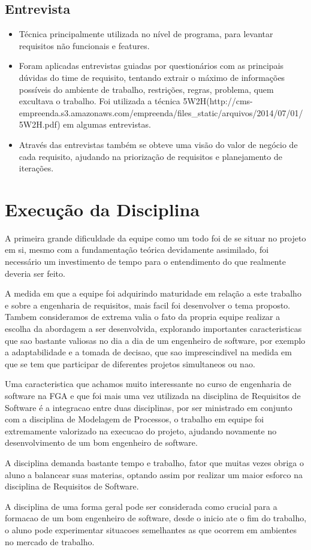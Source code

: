 \subsection{Entrevista}
\begin{itemize}
\item Técnica principalmente utilizada no nível de programa, para levantar requisitos não funcionais e features.
\item Foram aplicadas entrevistas  guiadas por questionários  com as principais dúvidas do time de requisito, tentando extrair o máximo de informações possíveis do ambiente de trabalho, restrições, regras, problema, quem excultava o trabalho. Foi utilizada a técnica 5W2H(http://cms-empreenda.s3.amazonaws.com/empreenda/files_static/arquivos/2014/07/01/5W2H.pdf) em algumas entrevistas.
\item Através das entrevistas também se obteve uma visão do valor de negócio de cada requisito, ajudando na priorização de requisitos e planejamento de iterações.
\end{itemize}


\section{Execução da Disciplina}

A primeira grande dificuldade da equipe como um todo foi de se situar no projeto em si,
mesmo com a fundamentação teórica devidamente assimilado, foi necessário um investimento
de tempo para o entendimento do que realmente deveria ser feito.

A medida em que a equipe foi adquirindo maturidade em relação a este trabalho e sobre a
engenharia de requisitos, mais facil foi desenvolver o tema proposto. Tambem consideramos
de extrema valia o fato da propria equipe realizar a escolha da abordagem a ser desenvolvida,
explorando importantes caracteristicas que sao bastante valiosas no dia a dia de um engenheiro
de software, por exemplo a adaptabilidade e a tomada de decisao, que sao imprescindivel na
medida em que se tem que participar de diferentes projetos simultaneos ou nao.

Uma caracteristica que achamos muito interessante no curso de engenharia de software na
FGA e que foi mais uma vez utilizada na disciplina de Requisitos de Software é a integracao
entre duas disciplinas, por ser ministrado em conjunto com a disciplina de Modelagem de
Processos, o trabalho em equipe foi extremamente valorizado na execucao do projeto, ajudando
novamente no desenvolvimento de um bom engenheiro de software.

A disciplina demanda bastante tempo e trabalho, fator que muitas vezes obriga o aluno
a balancear suas materias, optando assim por realizar um maior esforco na disciplina
de Requisitos de Software.

A disciplina de uma forma geral pode ser considerada como crucial para a formacao
de um bom engenheiro de software, desde o inicio ate o fim do trabalho, o aluno pode
experimentar situacoes semelhantes as que ocorrem em ambientes no mercado de trabalho.
